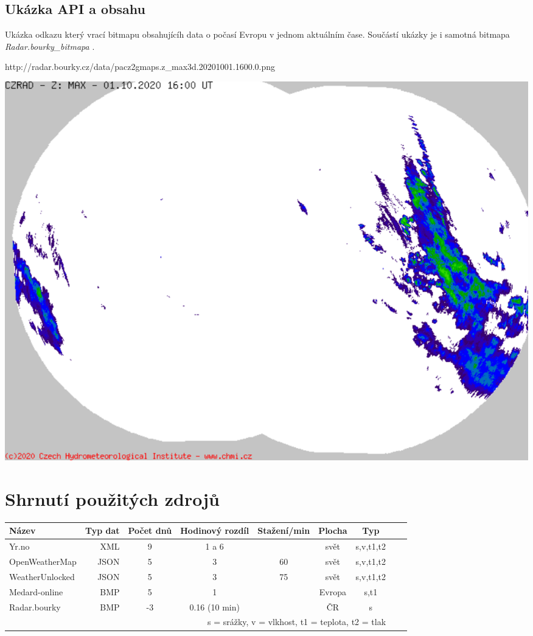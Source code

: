 \documentclass[czech,bachelor,dept460,male,csharp,cpdeclaration]{diploma}
\begin{document}
	\subsection{Ukázka API a obsahu}
	
	Ukázka odkazu který vrací bitmapu obsahujícíh data o počasí Evropu v jednom aktuálním čase. Součástí ukázky je i samotná bitmapa \emph{Radar.bourky\_bitmapa} \cite{chmi}.
	
	http://radar.bourky.cz/data/pacz2gmaps.z\_max3d.20201001.1600.0.png
	
	\begin{center}
		\includegraphics[scale=0.5]{Data/Rb_ukazka.png}
	\end{center}

	\section{Shrnutí použitých zdrojů}
	
	\begin{center}
		
		
		\begin{tabular} {l r c c c c c c c}
			
			Název & Typ dat & Počet dnů & Hodinový rozdíl & Stažení/min & Plocha & Typ \\
			\hline
			Yr.no & XML & 9 & 1 a 6 & & svět & s,v,t1,t2 \\ 
			OpenWeatherMap & JSON & 5 & 3 & 60 & svět & s,v,t1,t2 \\ 
			WeatherUnlocked & JSON & 5 & 3 & 75 & svět & s,v,t1,t2 \\ 
			Medard-online & BMP & 5 & 1 &  & Evropa & s,t1 \\ 
			Radar.bourky & BMP & -3 & 0.16 (10 min)& & ČR & s \\ 
			
			\multicolumn{7}{r}{\footnotesize *s = srážky, v = vlkhost, t1 = teplota, t2 = tlak}\\
			
		\end{tabular}
	\end{center}
	
\end{document}
